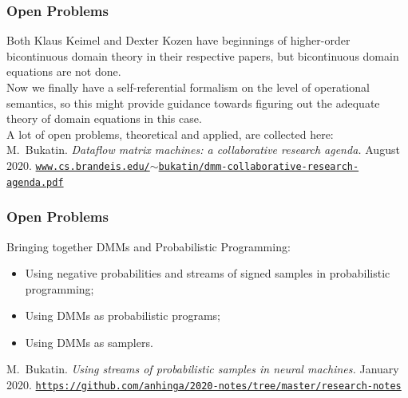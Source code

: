 \documentclass{beamer}
\begin{document}
\begin{frame}

   \frametitle{Open Problems}

   Both Klaus Keimel and Dexter Kozen have beginnings of higher-order bicontinuous domain theory
   in their respective papers, but bicontinuous domain equations are not done.\\[2ex]

   Now we finally have a self-referential formalism on the level of operational semantics,
   so this might provide guidance towards figuring out the adequate theory of domain
   equations in this case.\\[4ex] 

   A lot of open problems, theoretical and applied, are collected here:\\[2ex]

   {\small M.~Bukatin.
{\em Dataflow matrix machines: a collaborative research agenda.} August 2020.}
\href{https://www.cs.brandeis.edu/~bukatin/dmm-collaborative-research-agenda.pdf}{\tt\scriptsize www.cs.brandeis.edu/$\sim$bukatin/dmm-collaborative-research-agenda.pdf}

\end{frame}

\begin{frame}

   \frametitle{Open Problems}

   Bringing together DMMs and Probabilistic Programming:
   \begin{itemize}
       \item Using negative probabilities and streams of signed samples in probabilistic programming;
       \item Using DMMs as probabilistic programs;
       \item Using DMMs as samplers.\\[4ex]
   \end{itemize}

   {\small M.~Bukatin.
{\em Using streams of probabilistic samples in neural machines.} January 2020.}
\href{https://github.com/anhinga/2020-notes/tree/master/research-notes}{\tt\scriptsize https://github.com/anhinga/2020-notes/tree/master/research-notes}


\end{frame}
\end{document}
